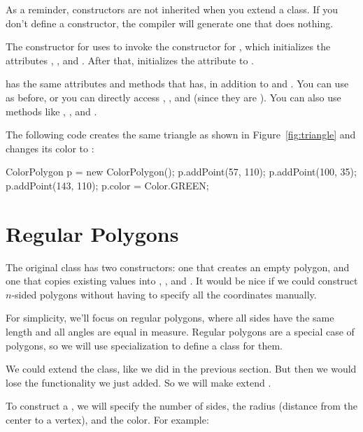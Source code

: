 As a reminder, constructors are not inherited when you extend a class.
If you don't define a constructor, the compiler will generate one that does nothing.

The constructor for  uses  to invoke the constructor for , which initializes the attributes , , and .
After that,  initializes the  attribute to .

 has the same attributes and methods that  has, in addition to  and .
You can use  as before, or you can directly access , , and  (since they are ).
You can also use methods like , , and .

The following code creates the same triangle as shown in Figure~\ref{fig:triangle} and changes its color to :

\begin{code}
ColorPolygon p = new ColorPolygon();
p.addPoint(57, 110);
p.addPoint(100, 35);
p.addPoint(143, 110);
p.color = Color.GREEN;
\end{code}


\section{Regular Polygons}

The original  class has two constructors: one that creates an empty polygon, and one that copies existing values into , , and .
It would be nice if we could construct $n$-sided polygons without having to specify all the coordinates manually.

For simplicity, we'll focus on regular polygons, where all sides have the same length and all angles are equal in measure.
Regular polygons are a special case of polygons, so we will use specialization to define a class for them.

We could extend the  class, like we did in the previous section.
But then we would lose the  functionality we just added.
So we will make  extend .

To construct a , we will specify the number of sides, the radius (distance from the center to a vertex), and the color.
For example:

